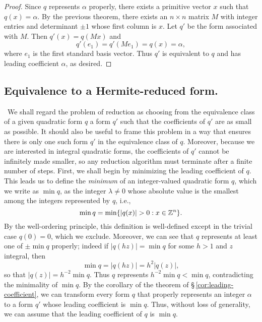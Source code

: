 \begin{proof}
  Since \(q\) represents \(\alpha\) properly, there exists a primitive vector \(x\) such that \(q(x) = \alpha\). By the previous theorem, there exists an \(n \times n\) matrix \(M\) with integer entries and determinant \(\pm 1\) whose first column is \(x\). Let \(q'\) be the form associated with \(M\). Then \(q'(x) = q(Mx)\) and
  \[
    q'(e_1) = q'(Me_1) = q(x) = \alpha,
  \]
  where \(e_1\) is the first standard basis vector. Thus \(q'\) is equivalent to \(q\) and has leading coefficient \(\alpha\), as desired.
\end{proof}

\subsection{Equivalence to a Hermite-reduced form.}~We shall regard the problem of reduction as choosing from the equivalence class of a given quadratic form \(q\) a form \(q'\) such that the coefficients of \(q'\) are as small as possible. It should also be useful to frame this problem in a way that ensures there is only one such form \(q'\) in the equivalence class of \(q\). Moreover, because we are interested in integral quadratic forms, the coefficients of \(q'\) cannot be infinitely made smaller, so any reduction algorithm must terminate after a finite number of steps. First, we shall begin by minimizing the leading coefficient of \(q\). This leads us to define the \emph{minimum} of an integer-valued quadratic form \(q\), which we write as \(\min q\), as the integer \(\lambda \neq 0\) whose absolute value is the smallest among the integers represented by \(q\), i.e.,
  \[
    \min q = \min \{|q(x)| > 0 : x \in \mathbb{Z}^n\}.
  \]\label{sec:minimum}
By the well-ordering principle, this definition is well-defined except in the trivial case \(q(0) = 0\), which we exclude. Moreover, we can see that \(q\) represents at least one  of \(\pm \min q\) properly; indeed if \(|q(hz)| = \min q\) for some \(h > 1\) and \(z\) integral, then
\[
  \min q = |q(hz)| = h^2|q(z)|,
\]
so that \(|q(z)| = h^{-2} \min q\). Thus \(q\) represents \(h^{-2} \min q < \min q\), contradicting the minimality of \(\min q\). By the corollary of the theorem of \S\,\ref{cor:leading-coefficient}, we can transform every form \(q\) that properly represents an integer \(\alpha\) to a form \(q'\) whose leading coefficient is \(\min q\). Thus, without loss of generality, we can assume that the leading coefficient of \(q\) is \(\min q\).

